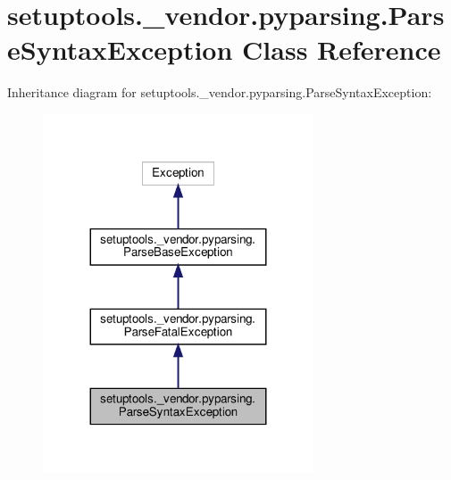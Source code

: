 \hypertarget{classsetuptools_1_1__vendor_1_1pyparsing_1_1ParseSyntaxException}{}\section{setuptools.\+\_\+vendor.\+pyparsing.\+Parse\+Syntax\+Exception Class Reference}
\label{classsetuptools_1_1__vendor_1_1pyparsing_1_1ParseSyntaxException}


Inheritance diagram for setuptools.\+\_\+vendor.\+pyparsing.\+Parse\+Syntax\+Exception\+:
\nopagebreak
\begin{figure}[H]
\begin{center}
\leavevmode
\includegraphics[width=227pt]{classsetuptools_1_1__vendor_1_1pyparsing_1_1ParseSyntaxException__inherit__graph}
\end{center}
\end{figure}


